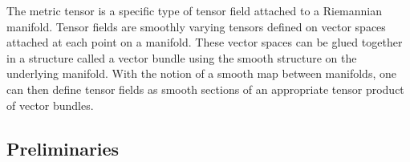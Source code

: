 The metric tensor is a specific type of tensor field attached to a Riemannian manifold.  Tensor fields are smoothly varying tensors defined on vector spaces attached at each point on a manifold.  These vector spaces can be glued together in a structure called a vector bundle using the smooth structure on the underlying manifold. With the notion of a smooth map between manifolds, one can then define tensor fields as smooth sections of an appropriate tensor product of vector bundles.  

\subsection{Preliminaries}
    
